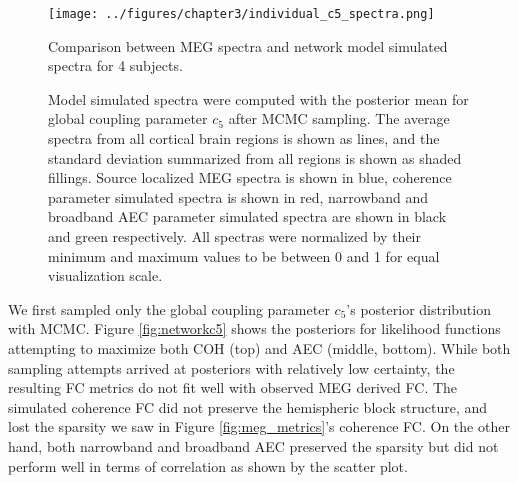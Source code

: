 \begin{figure}[htbp]
    \centering
    \texttt{[image: ../figures/chapter3/individual\_c5\_spectra.png]}
    \caption{Comparison between MEG spectra and network model simulated spectra for 4 subjects.}
    \caption*{Model simulated spectra were computed with the posterior mean for global coupling parameter $c_5$ after MCMC sampling. The average spectra from all cortical brain regions is shown as lines, and the standard deviation summarized from all regions is shown as shaded fillings. Source localized MEG spectra is shown in blue, coherence parameter simulated spectra is shown in red, narrowband and broadband AEC parameter simulated spectra are shown in black and green respectively. All spectras were normalized by their minimum and maximum values to be between 0 and 1 for equal visualization scale.}
    \label{fig:c5_spectra}
\end{figure}

We first sampled only the global coupling parameter $c_5$'s posterior distribution with MCMC. Figure \ref{fig:networkc5} shows the posteriors for likelihood functions attempting to maximize both COH (top) and AEC (middle, bottom). While both sampling attempts arrived at posteriors with relatively low certainty, the resulting FC metrics do not fit well with observed MEG derived FC. The simulated coherence FC did not preserve the hemispheric block structure, and lost the sparsity we saw in Figure \ref{fig:meg_metrics}'s coherence FC. On the other hand, both narrowband and broadband AEC preserved the sparsity but did not perform well in terms of correlation as shown by the scatter plot. 

